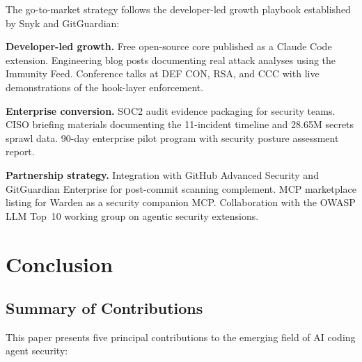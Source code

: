 \documentclass[11pt,letterpaper]{article}
\begin{document}
The go-to-market strategy follows the developer-led growth playbook established by
Snyk and GitGuardian:

\textbf{Developer-led growth.} Free open-source core published as a Claude Code
extension. Engineering blog posts documenting real attack analyses using the Immunity
Feed. Conference talks at DEF CON, RSA, and CCC with live demonstrations of the
hook-layer enforcement.

\textbf{Enterprise conversion.} SOC2 audit evidence packaging for security teams.
CISO briefing materials documenting the 11-incident timeline and 28.65M secrets
sprawl data. 90-day enterprise pilot program with security posture assessment report.

\textbf{Partnership strategy.} Integration with GitHub Advanced Security and
GitGuardian Enterprise for post-commit scanning complement. MCP marketplace listing
for Warden as a security companion MCP. Collaboration with the OWASP LLM Top~10
working group on agentic security extensions.

\section{Conclusion}

\subsection{Summary of Contributions}

This paper presents five principal contributions to the emerging field of AI coding
agent security:
\end{document}
